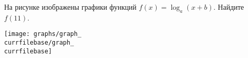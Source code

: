 \begin{ex}
	\begin{condition}
		\begin{minipage}[t]{0.67\textwidth}
			На рисунке изображены графики функций \( f(x)=\log_a(x+b) \). Найдите \( f(11) \). 
		\end{minipage}
		\begin{minipage}[c]{0.25\textwidth}
			\texttt{[image: graphs/graph\_\\currfilebase/graph\_\\currfilebase]}
		\end{minipage}
	\end{condition}
\end{ex}
